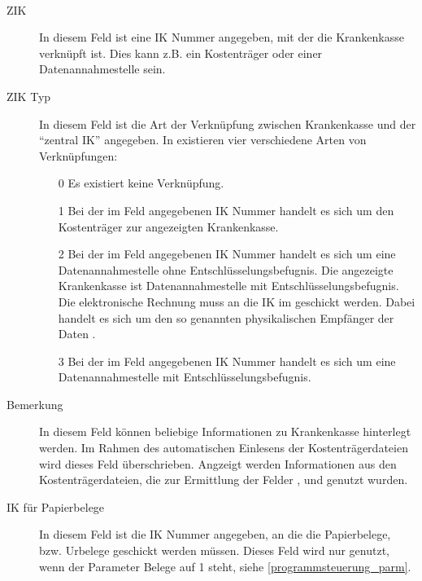 \paragraph{}

\begin{description}
\item[ZIK]
In diesem Feld ist eine IK Nummer angegeben, mit der die Krankenkasse
verknüpft ist. Dies kann z.B. ein Kostenträger oder einer Datenannahmestelle
sein.
\item[ZIK Typ]
In diesem Feld ist die Art der Verknüpfung zwischen Krankenkasse und der
``zentral IK'' angegeben. In \tinyHeb\/ existieren vier verschiedene Arten
von Verknüpfungen:

\begin{enumerate}
\item[0] 
Es existiert keine Verknüpfung.
\item[1]
Bei der im Feld  angegebenen IK Nummer handelt es sich um den
Kostenträger zur angezeigten Krankenkasse.
\item[2]
Bei der im Feld  angegebenen IK Nummer handelt es sich um eine
Datenannahmestelle ohne Entschlüsselungsbefugnis. Die angezeigte Krankenkasse
ist Datenannahmestelle mit Entschlüsselungsbefugnis. Die elektronische
Rechnung muss an die IK im  geschickt werden. Dabei handelt es
sich um den so genannten physikalischen Empfänger der Daten \cite{ktrdat}.
\item[3]
Bei der im Feld  angegebenen IK Nummer handelt es sich um eine
Datenannahmestelle mit Entschlüsselungsbefugnis.
\end{enumerate}

\item[Bemerkung]
In diesem Feld können beliebige Informationen zu Krankenkasse hinterlegt
werden. Im Rahmen des automatischen Einlesens der Kostenträgerdateien wird
dieses Feld überschrieben. Angzeigt werden Informationen aus den 
Kostenträgerdateien, die zur Ermittlung der Felder 
,  und  genutzt wurden.
\item[IK für Papierbelege]
In diesem Feld ist die IK Nummer angegeben, an die die Papierbelege, bzw.
Urbelege geschickt werden müssen. Dieses Feld wird nur genutzt, wenn der
Parameter Belege auf 1 steht, siehe \vref{programmsteuerung_parm}.
\end{description}


